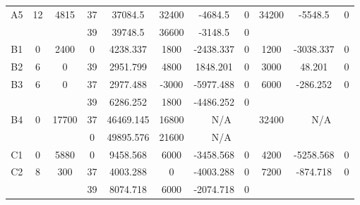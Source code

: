 \begin{sidewaystable}
\begin{tabular}{c||c|c||c|c|c|c|c||c|c|c}
        
      \\
      \hline
      \multirow{2}{*}{A5} &
      \multirow{2}{*}{12} &
      \multirow{2}{*}{4815} &
      37 &
      37084.5 &
      32400 &
        -4684.5 &
        0 &
      \multirow{2}{*}{34200} &
        \multirow{2}{*}{-5548.5} &
        \multirow{2}{*}{0}
      \\
      \cline{4-8}
       &
       &
       &
      39 &
      39748.5 &
      36600 &
        -3148.5 &
        0 &
      
         &
        
      \\
      \hline
      \multirow{1}{*}{B1} &
      \multirow{1}{*}{0} &
      \multirow{1}{*}{2400} &
      0 &
      4238.337 &
      1800 &
        -2438.337 &
        0 &
      \multirow{1}{*}{1200} &
        \multirow{1}{*}{-3038.337} &
        \multirow{1}{*}{0}
      \\
      \hline
      \multirow{1}{*}{B2} &
      \multirow{1}{*}{6} &
      \multirow{1}{*}{0} &
      39 &
      2951.799 &
      4800 &
        1848.201 &
        0 &
      \multirow{1}{*}{3000} &
        \multirow{1}{*}{48.201} &
        \multirow{1}{*}{0}
      \\
      \hline
      \multirow{2}{*}{B3} &
      \multirow{2}{*}{6} &
      \multirow{2}{*}{0} &
      37 &
      2977.488 &
      -3000 &
        -5977.488 &
        0 &
      \multirow{2}{*}{6000} &
        \multirow{2}{*}{-286.252} &
        \multirow{2}{*}{0}
      \\
      \cline{4-8}
       &
       &
       &
      39 &
      6286.252 &
      1800 &
        -4486.252 &
        0 &
      
         &
        
      \\
      \hline
      \multirow{2}{*}{B4} &
      \multirow{2}{*}{0} &
      \multirow{2}{*}{17700} &
      37 &
      46469.145 &
      16800 &
        \multicolumn{2}{|c||}{N/A} &
      \multirow{2}{*}{32400} &
        \multicolumn{2}{c}{\multirow{2}{*}{N/A}}
      \\
      \cline{4-8}
       &
       &
       &
      0 &
      49895.576 &
      21600 &
        \multicolumn{2}{|c||}{N/A} &
      
        
      \\
      \hline
      \multirow{1}{*}{C1} &
      \multirow{1}{*}{0} &
      \multirow{1}{*}{5880} &
      0 &
      9458.568 &
      6000 &
        -3458.568 &
        0 &
      \multirow{1}{*}{4200} &
        \multirow{1}{*}{-5258.568} &
        \multirow{1}{*}{0}
      \\
      \hline
      \multirow{2}{*}{C2} &
      \multirow{2}{*}{8} &
      \multirow{2}{*}{300} &
      37 &
      4003.288 &
      0 &
        -4003.288 &
        0 &
      \multirow{2}{*}{7200} &
        \multirow{2}{*}{-874.718} &
        \multirow{2}{*}{0}
      \\
      \cline{4-8}
       &
       &
       &
      39 &
      8074.718 &
      6000 &
        -2074.718 &
        0 &
      

\end{tabular}
\end{sidewaystable}
